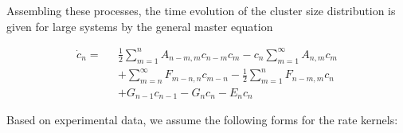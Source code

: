 \documentclass[12pt]{article}
\begin{document}


Assembling these processes, the time evolution of the cluster size distribution is given for large systems by the general master equation

\begin{align}
\dot{c}_n = \text{ }	& \frac{1}{2}\sum_{m=1}^{n} A_{n-m,m}c_{n-m}c_m - c_n\sum_{m=1}^{\infty}A_{n,m}c_m \nonumber\\
					&+\sum_{m=n}^{\infty} F_{m-n,n}c_{m-n} - \frac{1}{2}\sum_{m = 1}^{n}F_{n-m,m}c_n \nonumber\\[6pt]
					&+G_{n-1}c_{n-1} - G_nc_n  - E_nc_n 
\end{align}






Based on experimental data, we assume the following forms for the rate kernels:
\end{document}

